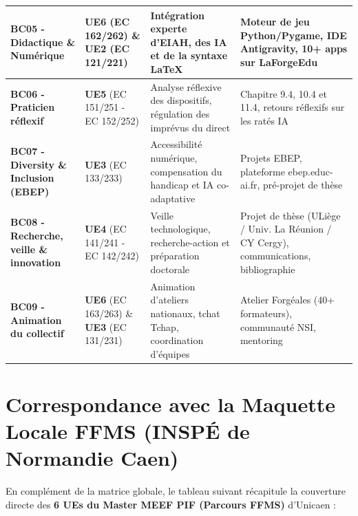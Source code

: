 \begin{landscape}
\begin{longtable}{|p{4.5cm}|p{4.5cm}|p{7.5cm}|p{7.5cm}|}
\textbf{BC05 - Didactique \& Numérique} & \textbf{UE6} (EC 162/262) \& \textbf{UE2} (EC 121/221) & Intégration experte d'EIAH, des IA et de la syntaxe \LaTeX{} & Moteur de jeu Python/Pygame, IDE Antigravity, 10+ apps sur LaForgeEdu \\
\hline

\textbf{BC06 - Praticien réflexif} & \textbf{UE5} (EC 151/251 - EC 152/252) & Analyse réflexive des dispositifs, régulation des imprévus du direct & Chapitre 9.4, 10.4 et 11.4, retours réflexifs sur les ratés IA \\
\hline

\textbf{BC07 - Diversity \& Inclusion (EBEP)} & \textbf{UE3} (EC 133/233) & Accessibilité numérique, compensation du handicap et IA co-adaptative & Projets EBEP, plateforme ebep.educ-ai.fr, pré-projet de thèse \\
\hline

\textbf{BC08 - Recherche, veille \& innovation} & \textbf{UE4} (EC 141/241 - EC 142/242) & Veille technologique, recherche-action et préparation doctorale & Projet de thèse (ULiège / Univ. La Réunion / CY Cergy), communications, bibliographie \\
\hline

\textbf{BC09 - Animation du collectif} & \textbf{UE6} (EC 163/263) \& \textbf{UE3} (EC 131/231) & Animation d'ateliers nationaux, tchat Tchap, coordination d'équipes & Atelier Forgéales (40+ formateurs), communauté NSI, mentoring \\
\hline

\end{longtable}

\end{landscape}

\section{Correspondance avec la Maquette Locale FFMS (INSPÉ de Normandie Caen)}

En complément de la matrice globale, le tableau suivant récapitule la couverture directe des \textbf{6 UEs du Master MEEF PIF (Parcours FFMS)} d'Unicaen :

